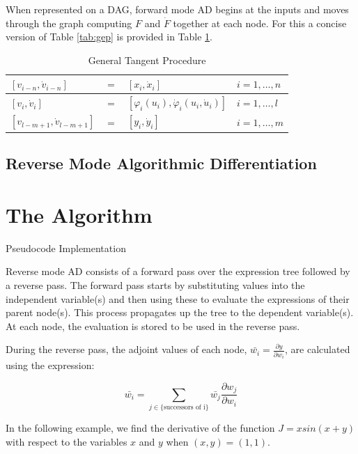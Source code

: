 \documentclass{article}
\begin{document}
When represented on a DAG, forward mode AD begins at the inputs and moves through the graph computing $F$ and $\Dot{F}$ together at each node. For this a concise version of Table \ref{tab:gep} is provided in Table \ref{tab:gtp}.

\begin{table}[h]
    \centering
    \begin{tabular}{|lcll|}
        \hline
        $[v_{i-n}, \Dot{v}_{i-n}]$ & $=$ & $[x_{i}, \Dot{x}_{i}]$ & $i = 1, \ldots, n$ \\
        \hline
        $[v_{i}, \Dot{v}_{i}]$ & $=$ & $[\varphi_i (u_i), \Dot{\varphi}_i(u_i, \Dot{u}_i)]$ & $i = 1, \ldots, l$ \\
        \hline
        $[v_{l-m+1}, \Dot{v}_{l-m+1}]$ & $=$ & $[y_{i}, \Dot{y}_{i}]$ & $i = 1, \ldots, m$ \\
        \hline
    \end{tabular}
    \caption{General Tangent Procedure}
    \label{tab:gtp}
\end{table}

\subsection{Reverse Mode Algorithmic Differentiation}

\section{The Algorithm}

Pseudocode Implementation

Reverse mode AD consists of a forward pass over the expression tree followed by a reverse pass. The forward pass starts by substituting values into the independent variable(s) and then using these to evaluate the expressions of their parent node(s). This process propagates up the tree to the dependent variable(s). At each node, the evaluation is stored to be used in the reverse pass.

During the reverse pass, the adjoint values of each node, $\bar{w_i} = \frac{\partial{y}}{\partial{w_i}}$, are calculated using the expression:

\begin{equation}
\bar{w_i} = \sum_{j\in\{\mbox{successors of i}\}} \bar{w_j}\frac{\partial{w_j}}{\partial{w_i}}
\end{equation}

In the following example, we find the derivative of the function $J = xsin(x+y)$ with respect to the variables $x$ and $y$ when $(x, y) = (1, 1)$.
\end{document}
